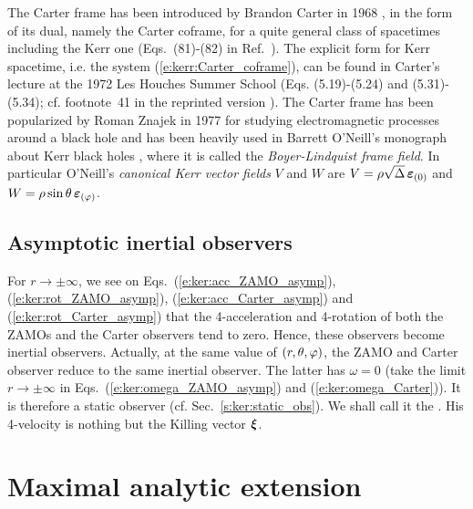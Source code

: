 \begin{hist}
The Carter frame has been introduced by Brandon Carter in 1968 \cite{Carte68b}, in
the form of its dual, namely the Carter coframe, for a quite general class of spacetimes including the Kerr one
(Eqs.~(81)-(82) in Ref.~\cite{Carte68b}). The explicit form for Kerr spacetime, i.e. the system
(\ref{e:kerr:Carter_coframe}), can be found in Carter's lecture at the 1972 Les Houches Summer School \cite{Carte73a} (Eqs. (5.19)-(5.24) and (5.31)-(5.34); cf. footnote~41 in the reprinted version \cite{Carte73a}).
The Carter frame has been popularized by Roman Znajek in 1977 \cite{Znaje77} for
studying electromagnetic processes around a black hole and has been heavily used in
Barrett O'Neill's monograph about Kerr black holes \cite{ONeil95}, where it is called the
\emph{Boyer-Lindquist frame field}. In particular O'Neill's \emph{canonical Kerr vector fields} $V$
and $W$ are $V= \rho\sqrt{\Delta} \, \bm{\varepsilon}_{(0)}$ and
$W = \rho\sin\theta \, \bm{\varepsilon}_{(\varphi)}$.
\end{hist}

\subsection{Asymptotic inertial observers} \label{s:ker:asymp_inertial_obs}

For $r\to\pm\infty$, we see on Eqs.~(\ref{e:ker:acc_ZAMO_asymp}), (\ref{e:ker:rot_ZAMO_asymp}),
(\ref{e:ker:acc_Carter_asymp}) and (\ref{e:ker:rot_Carter_asymp}) that the 4-acceleration
and 4-rotation of both the ZAMOs and the Carter observers tend to zero. Hence, these observers
become inertial observers.
Actually, at the same value of $(r,\theta,\varphi)$,
the ZAMO and Carter observer reduce to the same inertial observer. The latter has $\omega=0$
(take the limit $r\to\pm\infty$ in Eqs.~(\ref{e:ker:omega_ZAMO_asymp}) and (\ref{e:ker:omega_Carter})).
It is therefore a static observer (cf. Sec.~\ref{s:ker:static_obs}). We shall call it the
. His 4-velocity is nothing but the Killing vector $\bm{\xi}$.




\section{Maximal analytic extension} \label{s:ker:max_extension}

